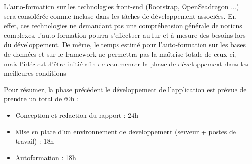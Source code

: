         L'auto-formation sur les technologies front-end (Bootstrap, OpenSeadragon ...) sera considérée comme incluse dans les tâches de développement associées. En effet, ces technologies ne demandant pas une compréhension générale de notions complexes, l'auto-formation pourra s'effectuer au fur et à mesure des besoins lors du développement. De même, le temps estimé pour l'auto-formation sur les bases de données et sur le framework ne permettra pas la maîtrise totale de ceux-ci, mais l'idée est d'être initié afin de commencer la phase de développement dans les meilleures conditions.

        Pour résumer, la phase précédent le développement de l'application est prévue de prendre un total de 60h :
        \begin{itemize}
            \item Conception et redaction du rapport : 24h
            \item Mise en place d'un environnement de développement (serveur + postes de travail) : 18h
            \item Autoformation : 18h
        \end{itemize}
